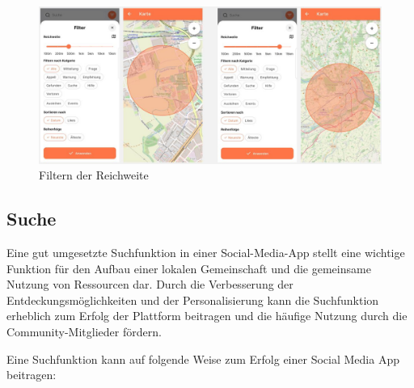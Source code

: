 \begin{figure}[h]
  \centering
  \includegraphics[width=\textwidth]{pics/range-filter.JPG}
  \caption{Filtern der Reichweite}
  \label{fig:range-filter}
\end{figure}

\subsection{Suche}

Eine gut umgesetzte Suchfunktion in einer Social-Media-App stellt eine wichtige Funktion für den Aufbau einer lokalen Gemeinschaft und die gemeinsame Nutzung von Ressourcen dar. Durch die Verbesserung der Entdeckungsmöglichkeiten und der Personalisierung kann die Suchfunktion erheblich zum Erfolg der Plattform beitragen und die häufige Nutzung durch die Community-Mitglieder fördern.

Eine Suchfunktion kann auf folgende Weise zum Erfolg einer Social Media App beitragen:

